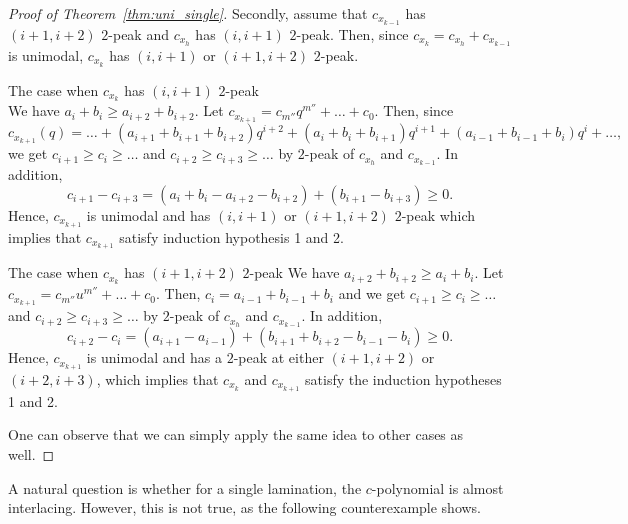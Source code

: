 \documentclass{article}
\theoremstyle{remark}
\begin{document}
\begin{proof}[Proof of Theorem~\ref{thm:uni_single}]
Secondly, assume that $c_{x_{k-1}}$ has $(i+1,i+2)$ $2$-peak and $c_{x_h}$ has $(i,i+1)$ $2$-peak. Then, since $c_{x_k}=c_{x_h}+c_{x_{k-1}}$ is unimodal, $c_{x_k}$ has $(i,i+1)$ or $(i+1,i+2)$ $2$-peak.
\item[(i)] The case when $c_{x_k}$ has $(i,i+1)$ $2$-peak\\
We have $a_{i}+b_i\ge a_{i+2}+b_{i+2}$. Let $c_{x_{k+1}}=c_{m''}q^{m''}+\dots+c_0$. Then, since \[
c_{x_{k+1}}(q)=\dots+(a_{i+1}+b_{i+1}+b_{i+2})q^{i+2}+(a_i+b_i+b_{i+1})q^{i+1}+(a_{i-1}+b_{i-1}+b_{i})q^{i}+\dots,
\]
we get $c_{i+1}\ge c_{i}\ge \dots$ and $c_{i+2}\ge c_{i+3}\ge \dots$ by $2$-peak of $c_{x_h}$ and $c_{x_{k-1}}$. In addition, \[
c_{i+1}-c_{i+3}=(a_i+b_i-a_{i+2}-b_{i+2})+(b_{i+1}-b_{i+3})\ge 0.
\]
Hence, $c_{x_{k+1}}$ is unimodal and has $(i,i+1)$ or $(i+1,i+2)$ $2$-peak which implies that $c_{x_{k+1}}$ satisfy induction hypothesis 1 and 2. 
\item[(ii)] The case when $c_{x_k}$ has $(i+1,i+2)$ $2$-peak
We have $a_{i+2}+b_{i+2}\ge a_{i}+b_{i}$. Let $c_{x_{k+1}}=c_{m''}u^{m''}+\dots+c_0$. Then, $c_i=a_{i-1}+b_{i-1}+b_i$ and we get $c_{i+1}\ge c_{i}\ge \dots$ and $c_{i+2}\ge c_{i+3}\ge \dots$ by $2$-peak of $c_{x_h}$ and $c_{x_{k-1}}$. In addition, \[
c_{i+2}-c_i=(a_{i+1}-a_{i-1})+(b_{i+1}+b_{i+2}-b_{i-1}-b_i)\ge 0.
\]
Hence, \( c_{x_{k+1}} \) is unimodal and has a \( 2 \)-peak at either \( (i+1,i+2) \) or \( (i+2,i+3) \), which implies that \( c_{x_k} \) and \( c_{x_{k+1}} \) satisfy the induction hypotheses 1 and 2.

One can observe that we can simply apply the same idea to other cases as well.
\end{proof}

A natural question is whether for a single lamination, the $c$-polynomial is almost interlacing. However, this is not true, as the following counterexample shows. 
\end{document}
